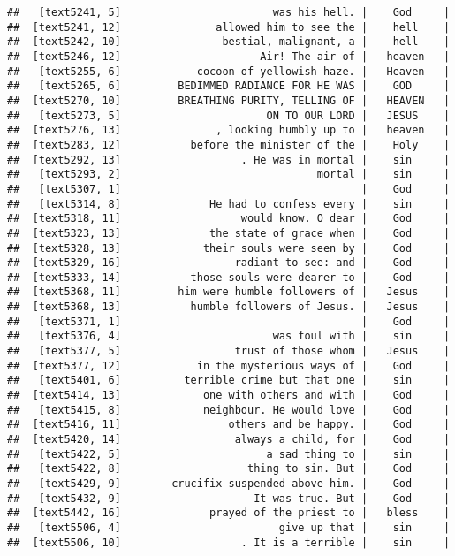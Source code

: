 \documentclass[]{article}
\begin{document}
\begin{verbatim}
##   [text5241, 5]                        was his hell. |    God     |
##  [text5241, 12]               allowed him to see the |    hell    |
##  [text5242, 10]                bestial, malignant, a |    hell    |
##  [text5246, 12]                      Air! The air of |   heaven   |
##   [text5255, 6]            cocoon of yellowish haze. |   Heaven   |
##   [text5265, 6]         BEDIMMED RADIANCE FOR HE WAS |    GOD     |
##  [text5270, 10]         BREATHING PURITY, TELLING OF |   HEAVEN   |
##   [text5273, 5]                       ON TO OUR LORD |   JESUS    |
##  [text5276, 13]               , looking humbly up to |   heaven   |
##  [text5283, 12]           before the minister of the |    Holy    |
##  [text5292, 13]                   . He was in mortal |    sin     |
##   [text5293, 2]                               mortal |    sin     |
##   [text5307, 1]                                      |    God     |
##   [text5314, 8]              He had to confess every |    sin     |
##  [text5318, 11]                   would know. O dear |    God     |
##  [text5323, 13]              the state of grace when |    God     |
##  [text5328, 13]             their souls were seen by |    God     |
##  [text5329, 16]                  radiant to see: and |    God     |
##  [text5333, 14]           those souls were dearer to |    God     |
##  [text5368, 11]         him were humble followers of |   Jesus    |
##  [text5368, 13]           humble followers of Jesus. |   Jesus    |
##   [text5371, 1]                                      |    God     |
##   [text5376, 4]                        was foul with |    sin     |
##   [text5377, 5]                  trust of those whom |   Jesus    |
##  [text5377, 12]            in the mysterious ways of |    God     |
##   [text5401, 6]          terrible crime but that one |    sin     |
##  [text5414, 13]             one with others and with |    God     |
##   [text5415, 8]             neighbour. He would love |    God     |
##  [text5416, 11]                 others and be happy. |    God     |
##  [text5420, 14]                  always a child, for |    God     |
##   [text5422, 5]                       a sad thing to |    sin     |
##   [text5422, 8]                    thing to sin. But |    God     |
##   [text5429, 9]        crucifix suspended above him. |    God     |
##   [text5432, 9]                     It was true. But |    God     |
##  [text5442, 16]              prayed of the priest to |   bless    |
##   [text5506, 4]                         give up that |    sin     |
##  [text5506, 10]                   . It is a terrible |    sin     |

\end{verbatim}
\end{document}
